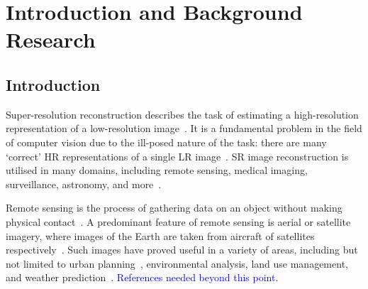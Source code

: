 \chapter{Introduction and Background Research}

\label{chapter1}

\section{Introduction}

Super-resolution reconstruction describes the task of estimating a high-resolution representation of a low-resolution image~\cite{superResOverview}. It is a fundamental problem in the field of computer vision due to the ill-posed nature of the task: there are many `correct' HR representations of a single LR image~\cite{superResChallenges,superResRemoteSensingOverview}. SR image reconstruction is utilised in many domains, including remote sensing, medical imaging, surveillance, astronomy, and more~\cite{superResRemoteSensingChallenges, superResRemoteSensingOverview, superResMedicalImaging, superResSurveillance, superResAstronomy, superResUses}.

Remote sensing is the process of gathering data on an object without making physical contact~\cite{remoteSensing}. A predominant feature of remote sensing is aerial or satellite imagery, where images of the Earth are taken from aircraft of satellites respectively~\cite{ref}. Such images have proved useful in a variety of areas, including but not limited to urban planning~\cite{remoteSensingUses}, environmental analysis, land use management, and weather prediction~\cite{remoteSensingGANsReview}. \textcolor{blue}{References needed beyond this point.}

